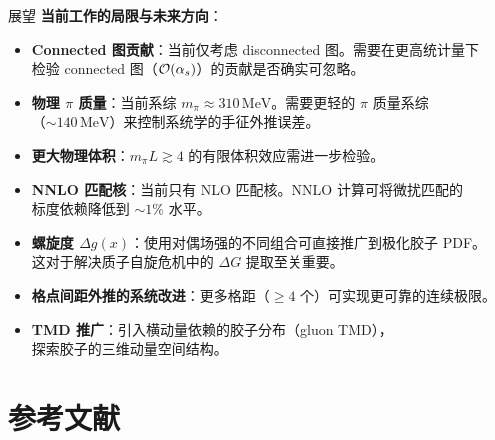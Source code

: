 \documentclass[10pt,aspectratio=169]{beamer}
\newcommand{\alphas}{\alpha_s}
\newcommand{\MeV}{\,\mathrm{MeV}}
\begin{document}
\begin{frame}{展望}
\small
\textbf{当前工作的局限与未来方向}：

\begin{itemize}
  \item \textbf{Connected 图贡献}：当前仅考虑 disconnected 图。需要在更高统计量下\\
  检验 connected 图（$\order{\alphas}$）的贡献是否确实可忽略。

  \item \textbf{物理 $\pi$ 质量}：当前系综 $m_\pi \approx 310\MeV$。需要更轻的 $\pi$ 质量系综\\
  （$\sim 140\MeV$）来控制系统学的手征外推误差。

  \item \textbf{更大物理体积}：$m_\pi L \gtrsim 4$ 的有限体积效应需进一步检验。

  \item \textbf{NNLO 匹配核}：当前只有 NLO 匹配核。NNLO 计算可将微扰匹配的\\
  标度依赖降低到 $\sim 1\%$ 水平。

  \item \textbf{螺旋度 $\Delta g(x)$}：使用对偶场强的不同组合可直接推广到极化胶子 PDF。\\
  这对于解决质子自旋危机中的 $\Delta G$ 提取至关重要。

  \item \textbf{格点间距外推的系统改进}：更多格距（$\ge 4$ 个）可实现更可靠的连续极限。

  \item \textbf{TMD 推广}：引入横动量依赖的胶子分布（gluon TMD），\\
  探索胶子的三维动量空间结构。
\end{itemize}
\end{frame}

\section{参考文献}
\end{document}
